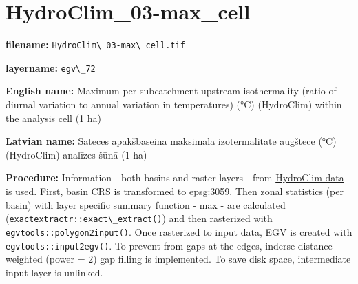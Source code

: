 \documentclass[
]{book}
\newcommand{\passthrough}[1]{#1}
\begin{document}
\section{HydroClim\_03-max\_cell}\label{ch06.072}

\textbf{filename:} \passthrough{\lstinline!HydroClim\_03-max\_cell.tif!}

\textbf{layername:} \passthrough{\lstinline!egv\_72!}

\textbf{English name:} Maximum per subcatchment upstream isothermality (ratio of diurnal variation to annual variation in temperatures) (°C) (HydroClim) within the analysis cell (1 ha)

\textbf{Latvian name:} Sateces apakšbaseina maksimālā izotermalitāte augštecē (°C) (HydroClim) analīzes šūnā (1 ha)

\textbf{Procedure:} Information - both basins and raster layers - from \hyperref[Ch04.12]{HydroClim data}
is used. First, basin CRS is transformed to epsg:3059. Then zonal statistics (per basin) with
layer specific summary function - max - are calculated (\passthrough{\lstinline!exactextractr::exact\_extract()!})
and then rasterized with \passthrough{\lstinline!egvtools::polygon2input()!}. Once rasterized to input data,
EGV is created with \passthrough{\lstinline!egvtools::input2egv()!}. To prevent from gaps at the edges,
inderse distance weighted (power = 2) gap filling is implemented. To save disk space,
intermediate input layer is unlinked.
\end{document}
